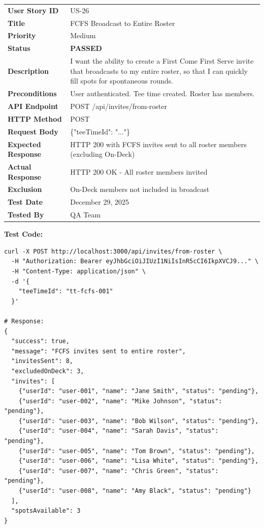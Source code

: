 \documentclass[11pt,a4paper]{article}
\newcommand{\passed}{\textcolor{pass}{\textbf{PASSED}}}
\begin{document}
\begin{tabularx}{\textwidth}{|p{3.2cm}|Y|}
\hline
{}
 \\
\hline
\textbf{User Story ID} & US-26 \\
\hline
\textbf{Title} & FCFS Broadcast to Entire Roster \\
\hline
\textbf{Priority} & Medium \\
\hline
\textbf{Status} & \passed \\
\hline
\textbf{Description} & I want the ability to create a First Come First Serve invite that broadcasts to my entire roster, so that I can quickly fill spots for spontaneous rounds. \\
\hline
\textbf{Preconditions} & User authenticated. Tee time created. Roster has members. \\
\hline
\textbf{API Endpoint} & POST /api/invites/from-roster \\
\hline
\textbf{HTTP Method} & POST \\
\hline
\textbf{Request Body} & \{"teeTimeId": "..."\} \\
\hline
\textbf{Expected Response} & HTTP 200 with FCFS invites sent to all roster members (excluding On-Deck) \\
\hline
\textbf{Actual Response} & HTTP 200 OK - All roster members invited \\
\hline
\textbf{Exclusion} & On-Deck members not included in broadcast \\
\hline
\textbf{Test Date} & December 29, 2025 \\
\hline
\textbf{Tested By} & QA Team \\
\hline
\end{tabularx}

\vspace{0.3cm}
\textbf{Test Code:}
\begin{lstlisting}
curl -X POST http://localhost:3000/api/invites/from-roster \
  -H "Authorization: Bearer eyJhbGciOiJIUzI1NiIsInR5cCI6IkpXVCJ9..." \
  -H "Content-Type: application/json" \
  -d '{
    "teeTimeId": "tt-fcfs-001"
  }'

# Response:
{
  "success": true,
  "message": "FCFS invites sent to entire roster",
  "invitesSent": 8,
  "excludedOnDeck": 3,
  "invites": [
    {"userId": "user-001", "name": "Jane Smith", "status": "pending"},
    {"userId": "user-002", "name": "Mike Johnson", "status": "pending"},
    {"userId": "user-003", "name": "Bob Wilson", "status": "pending"},
    {"userId": "user-004", "name": "Sarah Davis", "status": "pending"},
    {"userId": "user-005", "name": "Tom Brown", "status": "pending"},
    {"userId": "user-006", "name": "Lisa White", "status": "pending"},
    {"userId": "user-007", "name": "Chris Green", "status": "pending"},
    {"userId": "user-008", "name": "Amy Black", "status": "pending"}
  ],
  "spotsAvailable": 3
}
\end{lstlisting}
\end{document}
